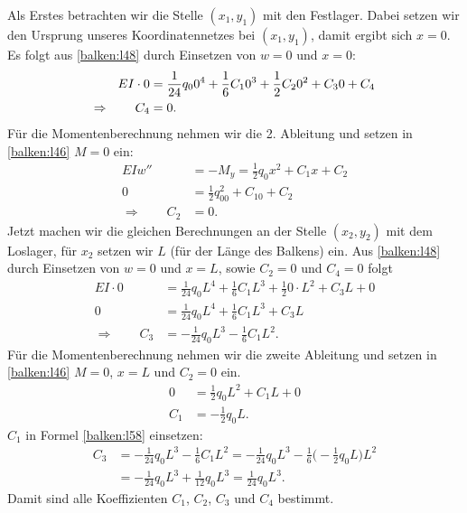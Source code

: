Als Erstes betrachten wir die Stelle $(x_1, y_1)$ mit den Festlager.
Dabei setzen wir den Ursprung unseres Koordinatennetzes bei $(x_1, y_1)$, damit ergibt sich $x = 0$.
Es folgt aus \eqref{balken:l48} durch Einsetzen von $w = 0$ und $x = 0$:
\begin{align}
EI\cdot0
&=
	\frac{1}{24}q_00^4+\frac{1}{6}C_10^3+\frac{1}{2}C_20^2+C_30+C_4
\notag
\\
	\Rightarrow\qquad C_4&=
	0.
\label{balken:l58}
\end{align}
Für die Momentenberechnung nehmen wir die 2. Ableitung und setzen in
\eqref{balken:l46}
$M = 0$ ein:
\begin{align*}
EIw''&= -M_y= \frac{1}{2}q_0x^2+C_1x+C_2
\\
0&= \frac{1}{2}q_00^2+C_10+C_2
\\
\Rightarrow\qquad C_2&= 0.
\end{align*}
Jetzt machen wir die gleichen Berechnungen an der Stelle $(x_2, y_2)$ mit dem Loslager, für $x_2$ setzen wir $L$ (für der Länge des Balkens) ein.
Aus \eqref{balken:l48}
durch Einsetzen von $w = 0$ und $x = L$, sowie $C_2 = 0$ und $C_4 = 0$ folgt
\begin{align*}
	EI\cdot0&=
	\frac{1}{24}q_0L^4+\frac{1}{6}C_1L^3+\frac{1}{2}0\cdot L^2+C_3L+0
\\
	0&=
	\frac{1}{24}q_0L^4+\frac{1}{6}C_1L^3+C_3L
\\
	\Rightarrow\qquad C_3&=
	-\frac{1}{24}q_0L^3-\frac{1}{6}C_1L^2.
\end{align*}
Für die Momentenberechnung nehmen wir die zweite Ableitung und setzen in
\eqref{balken:l46}
$M = 0$, $x = L$ und $C_2 = 0$ ein.
\begin{align*}
		0 &=
		\frac{1}{2}q_0L^2+C_1L+0
    \\
		C_1&=
		-\frac{1}{2}q_0L.
\end{align*}
$C_1$ in Formel \eqref{balken:l58} einsetzen:
\begin{align*}
	C_3&=
	-\frac{1}{24}q_0L^3-\frac{1}{6}C_1L^2
	=	-\frac{1}{24}q_0L^3-\frac{1}{6}\biggl(-\frac{1}{2}q_0L\biggr)L^2
\\
	&=	-\frac{1}{24}q_0L^3+\frac{1}{12}q_0L^3
	=	\frac{1}{24}q_0L^3.
\end{align*}
Damit sind alle Koeffizienten $C_1$, $C_2$, $C_3$ und $C_4$ bestimmt.

